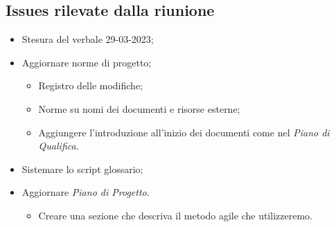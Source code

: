 \subsection{Issues rilevate dalla riunione}
\begin{itemize}
    \item Stesura del verbale 29-03-2023;
    \item Aggiornare norme di progetto;
    \begin{itemize}
        \item Registro delle modifiche;
        \item Norme su nomi dei documenti e risorse esterne;
        \item Aggiungere l'introduzione all'inizio dei documenti come nel \textit{Piano di Qualifica}. 
    \end{itemize}
    \item Sistemare lo script glossario;
    \item Aggiornare \textit{Piano di Progetto}.
    \begin{itemize}
        \item Creare una sezione che descriva il metodo agile che utilizzeremo.
    \end{itemize}
\end{itemize}